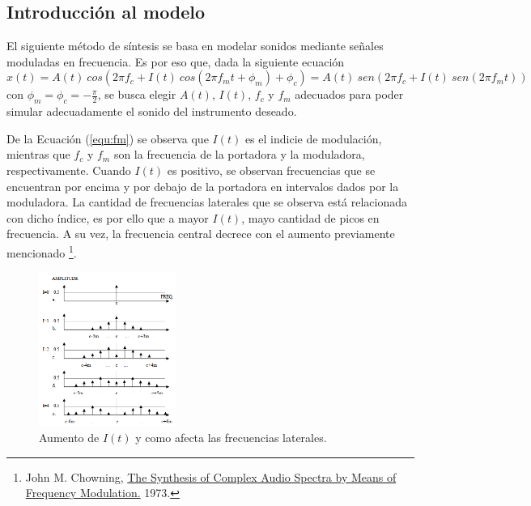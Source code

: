 



\subsection{Introducción al modelo}

El siguiente método de síntesis se basa en modelar sonidos mediante señales moduladas en frecuencia. Es por eso que, dada la siguiente ecuación
\begin{equation}
	x(t) = A(t) \ cos \left( 2 \pi f_c + I(t) \ cos \left( 2 \pi f_m t + \phi_m \right) + \phi_c \right) = A(t) \ sen \left( 2 \pi f_c + I(t) \ sen \left( 2 \pi f_m t \right) \right)
	\label{equ:fm}
\end{equation}
con $\phi_m = \phi_c = -\frac{\pi}{2}$, se busca elegir $A(t)$, $I(t)$, $f_c$ y $f_m$ adecuados para poder simular adecuadamente el sonido del instrumento deseado.

De la Ecuación (\ref{equ:fm}) se observa que $I(t)$ es el indicie de modulación, mientras que $f_c$ y $f_m$ son la frecuencia de la portadora y la moduladora, respectivamente. Cuando $I(t)$ es positivo, se observan frecuencias que se encuentran por encima y por debajo de la portadora en intervalos dados por la moduladora. La cantidad de frecuencias laterales que se observa está relacionada con dicho índice, es por ello que a mayor $I(t)$, mayo cantidad de picos en frecuencia. A su vez, la frecuencia central decrece con el aumento previamente mencionado \footnote{John M. Chowning, \href{https://ccrma.stanford.edu/sites/default/files/user/jc/fm_synthesispaper-2.pdf}{The Synthesis of Complex Audio Spectra by Means of Frequency Modulation.} 1973.}.
\begin{figure}[H]
	\centering
	\includegraphics[width=0.4\textwidth]{ImagenesEjercicio3/Increasing-BW-I.png}
	\caption{Aumento de $I(t)$ y como afecta las frecuencias laterales.}
	\label{fig:Iaumenta}
\end{figure}

